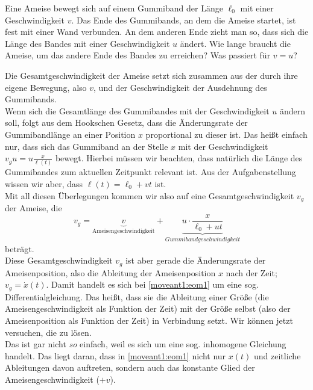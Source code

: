 \begin{Exercise}[label = moveant, origin = Jaan Kalda, difficulty = 3, title = Ameise auf dem Laufband]
	Eine Ameise bewegt sich auf einem Gummiband der Länge $\ell_0$ mit einer Geschwindigkeit $v$. Das Ende des Gummibands, an dem die Ameise startet, ist fest mit einer Wand verbunden. An dem anderen Ende zieht man so, dass sich die Länge des Bandes mit einer Geschwindigkeit $u$ ändert. Wie lange braucht die Ameise, um das andere Ende des Bandes zu erreichen? Was passiert für $v=u$?
\end{Exercise}
\begin{Answer}[ref = moveant]
	Die Gesamtgeschwindigkeit der Ameise setzt sich zusammen aus der durch ihre eigene Bewegung, also $v$, und der Geschwindigkeit der Ausdehnung des Gummibands.\\
	Wenn sich die Gesamtlänge des Gummibandes mit der Geschwindigkeit $u$ ändern soll, folgt aus dem Hookschen Gesetz, dass die Änderungsrate der Gummibandlänge an einer Position $x$ proportional zu dieser ist. Das heißt einfach nur, dass sich das Gummiband an der Stelle $x$ mit der Geschwindigkeit $v_gu = u \frac{x}{\ell\left(t\right)}$ bewegt. Hierbei müssen wir beachten, dass natürlich die Länge des Gummibandes zum aktuellen Zeitpunkt relevant ist. Aus der Aufgabenstellung wissen wir aber, dass $\ell\left(t\right) = \ell_0 + v t $ ist. \\
	Mit all diesen Überlegungen kommen wir also auf eine Gesamtgeschwindigkeit $v_g$ der Ameise, die 
	\begin{equation}\label{moveant1:eom1}
	v_g = 	\underbrace{v}_{\mathrm{Ameisengeschwindigkeit}} +\underbrace{u\cdot \frac{x}{\ell_0 + u t}}_{Gummibandgeschwindigkeit}
	\end{equation}
	beträgt.\\
	Diese Gesamtgeschwindigkeit $v_g$ ist aber gerade die Änderungsrate der Ameisenposition, also die Ableitung der Ameisenposition $x$ nach der Zeit; $v_g = \dot{x}\left(t\right)$. Damit handelt es sich bei \eqref{moveant1:eom1} um eine sog. Differentialgleichung. Das heißt, dass sie die Ableitung einer Größe (die Ameisengeschwindigkeit als Funktion der Zeit) mit der Größe selbst (also der Ameisenposition als Funktion der Zeit) in Verbindung setzt. Wir können jetzt versuchen, die zu lösen.\\
	Das ist gar nicht \textit{so} einfach, weil es sich um eine sog. inhomogene Gleichung handelt. Das liegt daran, dass in \eqref{moveant1:eom1} nicht nur $x\left(t\right)$ und zeitliche Ableitungen davon auftreten, sondern auch das konstante Glied der Ameisengeschwindigkeit ($+v$).\\

\end{Answer}
